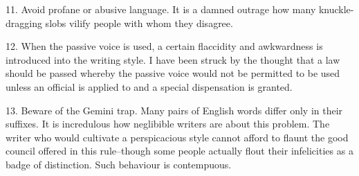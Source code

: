 \documentclass[a4paper]{article}
\begin{document}
11. Avoid profane or abusive language.  It is a damned outrage how many knuckle-dragging slobs vilify people with whom they disagree.

12.  When the passive voice is used, a certain flaccidity and awkwardness is introduced into the writing style.  I have been struck by the thought that a law should be passed whereby the passive voice would not be permitted to be used unless an official is applied to and a special dispensation is granted.

13.  Beware of the Gemini trap.  Many pairs of English words differ only in their suffixes.  It is incredulous how neglibible writers are about this problem.  The writer who would cultivate a perspicacious style cannot afford to flaunt the good council  offered in this rule--though some people actually flout their infelicities as a badge of distinction.  Such behaviour is contempuous.
\end{document}
